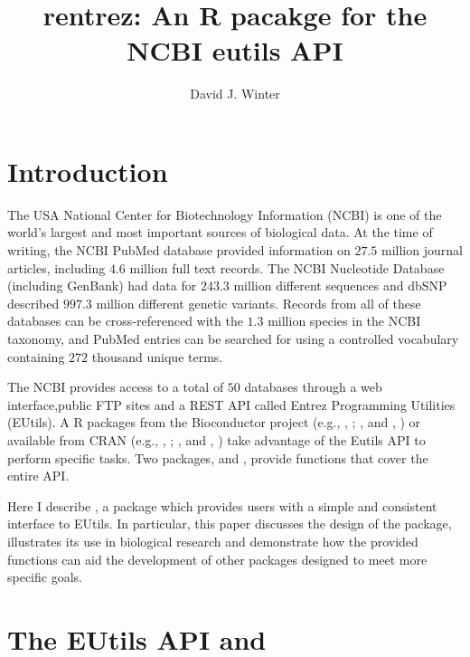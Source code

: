 \title{rentrez: An R pacakge for the NCBI eutils API}
\author{David J. Winter}

\maketitle


\section{Introduction}

The USA National Center for Biotechnology Information (NCBI) is one of the world's 
largest and most important sources of biological data. At the time of writing, the NCBI
PubMed database provided information on $27.5$ million journal
articles, including $4.6$ million full text records. The NCBI
Nucleotide Database (including GenBank) had data for $243.3$ million different sequences and dbSNP described $997.3$ 
million different genetic variants. Records from all of these databases can be 
cross-referenced with the  $1.3$ 
million species in the NCBI taxonomy, and PubMed entries can be searched for using a 
controlled vocabulary containing $272$ thousand unique terms. 

The NCBI provides access to a total of $50$ databases 
through a web interface,public FTP sites and a REST API called Entrez Programming Utilities (EUtils). A
R packages from the Bioconductor project (e.g., ,
\citealt{genomes}; , \citealt{RMassBank} and ,
\citealt{MeSHSim}) or available from CRAN (e.g., , \citealt{APE};
, \citealt{RISmed} and , \citealt{miner})  
take advantage of the Eutils API to perform specific tasks. Two packages,
 and  \citep{reutils}, provide functions that 
cover the entire 
API.  

Here I describe , a package which provides users with a simple and
consistent interface to EUtils. In particular, this paper discusses the design 
of the package, illustrates its use in biological research and demonstrate how 
the provided functions can aid the development of other packages designed to 
meet more specific goals.


\section{The EUtils API and  }

